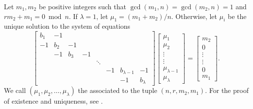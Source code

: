 Let $m_1,m_2$ be positive integers such that $\gcd(m_1,n) = \gcd(m_2,n)=1$ and $rm_2+m_1 = 0 \bmod n$. If $\lambda=1$, let $\mu_1 = (m_1+m_2)/n$. Otherwise, let $\mu_i$ be the unique solution to the system of equations
\[ \left[ \begin{array}{cccccccc}
 b_1 & -1  &     &    &  & & & \\
 -1  & b_2 & -1  &    &  & & & \\
     & -1  & b_3 & -1 &  & & & \\
     &     &     &    & \ddots & & & \\
     &     &     &    &  & -1 & b_{\lambda-1} & -1 \\
     &     &     &    &  &    & -1 & b_{\lambda} 
\end{array} \right] \left[ \begin{array}{c} \mu_1 \\ \mu_2 \\ \vdots \\ \vdots \\ \mu_{\lambda-1} \\ \mu_{\lambda} \end{array} \right] = \left[ \begin{array}{c} m_2 \\ 0 \\ \vdots \\ \vdots \\ 0 \\ m_1 \end{array} \right] .\]
We call $(\mu_1,\mu_2,\ldots,\mu_{\lambda})$ the {} associated to the tuple $(n,r,m_2,m_1)$. For the proof of existence and uniqueness, see \cite[Corollary~2.4.3]{ces}.

